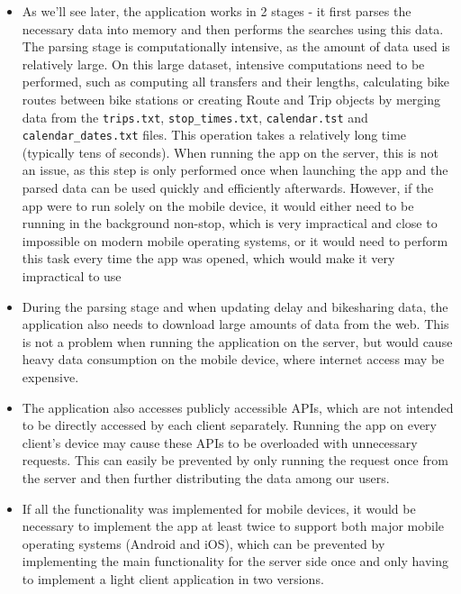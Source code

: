 \begin{itemize}
    \item As we'll see later, the application works in 2 stages - it first parses the necessary data into memory and then performs the searches using this data. The parsing stage is computationally intensive, as the amount of data used is relatively large. On this large dataset, intensive computations need to be performed, such as computing all transfers and their lengths, calculating bike routes between bike stations or creating Route and Trip objects by merging data from the \texttt{trips.txt}, \texttt{stop\_times.txt}, \texttt{calendar.tst} and \texttt{calendar\_dates.txt} files. This operation takes a relatively long time (typically tens of seconds). When running the app on the server, this is not an issue, as this step is only performed once when launching the app and the parsed data can be used quickly and efficiently afterwards. However, if the app were to run solely on the mobile device, it would either need to be running in the background non-stop, which is very impractical and close to impossible on modern mobile operating systems, or it would need to perform this task every time the app was opened, which would make it very impractical to use

    \item During the parsing stage and when updating delay and bikesharing data, the application also needs to download large amounts of data from the web. This is not a problem when running the application on the server, but would cause heavy data consumption on the mobile device, where internet access may be expensive.

    \item The application also accesses publicly accessible APIs, which are not intended to be directly accessed by each client separately. Running the app on every client's device may cause these APIs to be overloaded with unnecessary requests. This can easily be prevented by only running the request once from the server and then further distributing the data among our users.

    \item If all the functionality was implemented for mobile devices, it would be necessary to implement the app at least twice to support both major mobile operating systems (Android and iOS), which can be prevented by implementing the main functionality for the server side once and only having to implement a light client application in two versions.
\end{itemize}


